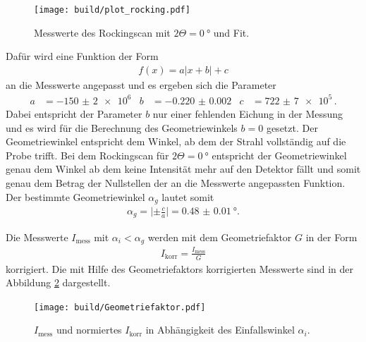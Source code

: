 \begin{figure}
  \centering
  \texttt{[image: build/plot\_rocking.pdf]}
  \caption{Messwerte des Rockingscan mit $2\Theta = \SI{0}{\degree}$ und Fit.}
  \label{fig:rock_scan_0}
\end{figure}

Dafür wird eine Funktion der Form
\begin{align}
  f(x) = a \lvert x + b \rvert + c
\end{align}
an die Messwerte angepasst und es ergeben sich die Parameter
\begin{align}
  a&=-\num{150(2)e6}  &b&=\num{-0.220(2)}  &c&=\num{722(7)e5} \, .
\end{align}
Dabei entspricht der Parameter $b$ nur einer fehlenden Eichung in der Messung und
es wird für die Berechnung des Geometriewinkels $b=0$ gesetzt.
Der Geometriewinkel entspricht dem Winkel, ab dem der Strahl
vollständig auf die Probe trifft. Bei dem Rockingscan für $2\Theta=\SI{0}{\degree}$
entspricht der Geometriewinkel genau dem Winkel ab dem keine Intensität
mehr auf den Detektor fällt und somit genau dem Betrag der Nullstellen der an die Messwerte
angepassten Funktion.
Der bestimmte Geometriewinkel $\alpha_g$
lautet somit
\begin{align}
\alpha_g = \lvert \pm\frac{c}{a} \rvert = \SI{0.48(1)}{\degree}.
\end{align}


Die Messwerte $I_{\mathrm{mess}}$ mit $\alpha_i < \alpha_g $ werden mit dem Geometriefaktor $G$
in der Form
\begin{align}
  I_{\mathrm{korr}} = \frac{I_{\mathrm{mess}}}{G}
\end{align}
korrigiert. Die mit Hilfe des Geometriefaktors korrigierten Messwerte sind in der Abbildung \ref{fig:korr} dargestellt.
\begin{figure}
  \centering
  \texttt{[image: build/Geometriefaktor.pdf]}
  \caption{$I_{\mathrm{mess}}$ und normiertes $I_{\mathrm{korr}}$ in Abhängigkeit des Einfallswinkel $\alpha_i$.}
  \label{fig:korr}
\end{figure}

